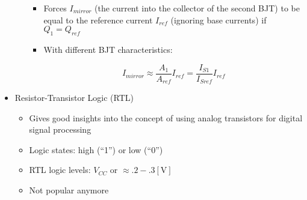 \begin{itemize}
\begin{itemize}
        \begin{itemize}

          \item Forces $I_{mirror}$ (the current into the collector of the second BJT) to be equal to the reference current $I_{ref}$ (ignoring base currents) if $Q_1=Q_{ref}$

          \item With different BJT characteristics:

            $$I_{mirror}\approx \frac{A_1}{A_{ref}}I_{ref}=\frac{I_{S1}}{I_{Sref}}I_{ref}$$

        \end{itemize}

    \end{itemize}

  \item Resistor-Transistor Logic (RTL)

    \begin{itemize}

      \item Gives good insights into the concept of using analog transistors for digital signal processing

      \item Logic states: high (``1'') or low (``0'')

      \item RTL logic levels: $V_{CC}$ or $\approx .2-.3[\si{\volt}]$

      \item Not popular anymore

    \end{itemize}

\end{itemize}



